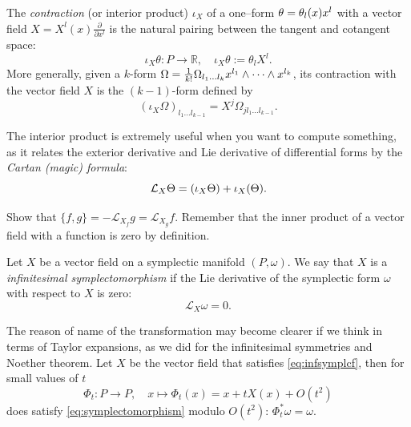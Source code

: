 \documentclass[english,fontsize=11pt,paper=a5,oneside]{scrbook}
\newcommand{\cL}{\mathcal{L}}
\newcommand{\R}{\mathbb{R}}
\let\d\relax
\DeclareMathOperator{\d}{d}
\theoremstyle{definition}
\newenvironment{exercise}
  {\pushQED{\qed}\renewcommand{\qedsymbol}{$\maltese$}\exercisex}
  {\popQED\endexercisex}
\begin{document}
The \emph{contraction} (or interior product) $\iota_X$ of a one--form $\theta = \theta_l(x)\d x^l$ with a vector field $X = X^l(x)\frac{\partial}{\partial x^l}$ is the natural pairing between the tangent and cotangent space:
\begin{equation}
    \iota_X \theta : P \to \R, \quad \iota_X \theta := \theta_l X^l.
\end{equation}
More generally, given a $k$-form $\Omega = \frac1{k!}\Omega_{l_1\ldots l_k} \d x^{l_1}\wedge\cdots\wedge\d x^{l_k}$, its contraction with the vector field $X$ is the $(k-1)$-form defined by
\begin{equation}\label{eq:contraction}
    (\iota_X\Omega)_{l_1\ldots l_{k-1}} = X^j \Omega_{jl_1\ldots l_{k-1}}.
\end{equation}

The interior product is extremely useful when you want to compute something, as it relates the exterior derivative and Lie derivative of differential forms by the \emph{Cartan (magic) formula}:
\begin{equation}\label{eq:cartan}
    \cL_X \Theta = \d(\iota_X \Theta) + \iota_X (\d\Theta).
\end{equation}

\begin{exercise}
    Show that $\big\{f,g\big\} = -\cL_{X_f} g = \cL_{X_g} f$.
    Remember that the inner product of a vector field with a function is zero by definition.
\end{exercise}

\begin{tcolorbox}
    Let $X$ be a vector field on a symplectic manifold $(P,\omega)$.
    We say that $X$ is a \emph{infinitesimal symplectomorphism} if the Lie derivative of the symplectic form $\omega$ with respect to $X$ is zero:
    \begin{equation}\label{eq:infsymplcf}
        \cL_X \omega = 0.
    \end{equation}
\end{tcolorbox}

The reason of name of the transformation may become clearer if we think in terms of Taylor expansions, as we did for the infinitesimal symmetries and Noether theorem.
Let $X$ be the vector field that satisfies \eqref{eq:infsymplcf}, then for small values of $t$
\begin{equation}
    \Phi_t:P \to P, \quad x \mapsto \Phi_t(x) = x + t X(x) + O(t^2)
\end{equation}
does satisfy \eqref{eq:symplectomorphism} modulo $O(t^2)$: $\Phi_t^* \omega = \omega$.
\end{document}
